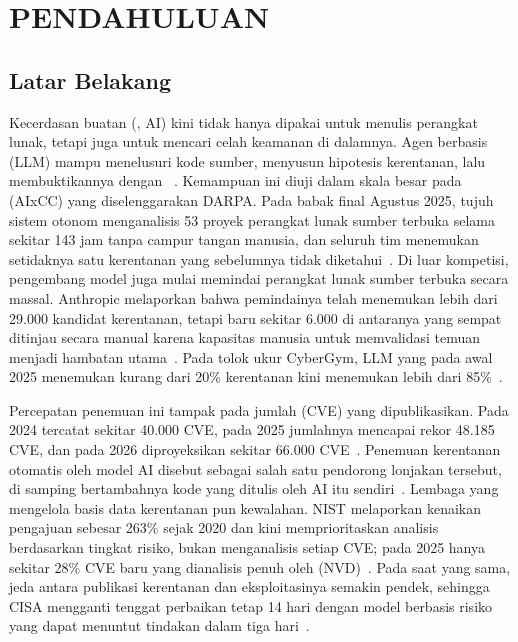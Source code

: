 \chapter{PENDAHULUAN}
\label{bab:pendahuluan}

\section{Latar Belakang}
\label{sec:latar-belakang}

Kecerdasan buatan (, AI) kini tidak hanya
dipakai untuk menulis perangkat lunak, tetapi juga untuk mencari celah keamanan
di dalamnya. Agen berbasis  (LLM) mampu menelusuri
kode sumber, menyusun hipotesis kerentanan, lalu membuktikannya dengan
~\cite{addisLLMBasedIntelligentAgents2026}. Kemampuan
ini diuji dalam skala besar pada  (AIxCC) yang
diselenggarakan DARPA. Pada babak final Agustus 2025, tujuh sistem otonom
menganalisis 53 proyek perangkat lunak sumber terbuka selama sekitar 143 jam
tanpa campur tangan manusia, dan seluruh tim menemukan setidaknya satu
kerentanan  yang sebelumnya tidak diketahui~\cite{zhang2026aixcc}.
Di luar kompetisi, pengembang model juga mulai memindai perangkat lunak sumber
terbuka secara massal. Anthropic melaporkan bahwa pemindainya telah menemukan
lebih dari 29.000 kandidat kerentanan, tetapi baru sekitar 6.000 di antaranya
yang sempat ditinjau secara manual karena kapasitas manusia untuk memvalidasi
temuan menjadi hambatan utama~\cite{anthropic2026ossscanner}. Pada tolok ukur
CyberGym, LLM yang pada awal 2025 menemukan kurang dari 20\% kerentanan kini
menemukan lebih dari 85\%~\cite{anthropic2026ossscanner}.

Percepatan penemuan ini tampak pada jumlah  (CVE) yang dipublikasikan. Pada 2024 tercatat sekitar 40.000 CVE,
pada 2025 jumlahnya mencapai rekor 48.185 CVE, dan pada 2026 diproyeksikan
sekitar 66.000 CVE~\cite{hand2026vulnpocalypse}. Penemuan kerentanan otomatis
oleh model AI disebut sebagai salah satu pendorong lonjakan tersebut, di
samping bertambahnya kode yang ditulis oleh AI itu
sendiri~\cite{hand2026vulnpocalypse}. Lembaga yang mengelola basis data
kerentanan pun kewalahan. NIST melaporkan kenaikan pengajuan sebesar 263\%
sejak 2020 dan kini memprioritaskan analisis berdasarkan tingkat risiko, bukan
menganalisis setiap CVE; pada 2025 hanya sekitar 28\% CVE baru yang dianalisis
penuh oleh 
(NVD)~\cite{hand2026vulnpocalypse}. Pada saat yang sama, jeda antara
publikasi kerentanan dan eksploitasinya semakin pendek, sehingga CISA
mengganti tenggat perbaikan tetap 14 hari dengan model berbasis risiko yang
dapat menuntut tindakan dalam tiga hari~\cite{hand2026vulnpocalypse}.

